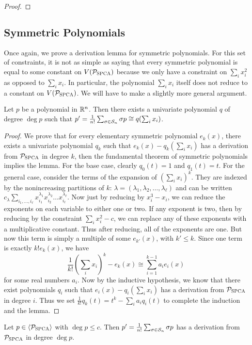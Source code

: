\begin{proof}
\end{proof}

\subsection{Symmetric Polynomials}
Once again, we prove a derivation lemma for symmetric polynomials. For this set of constraints, it is not as simple as saying that every symmetric polynomial is equal to some constant on $V(\mathcal P_{\textsc{SPCA}})$ because we only have a constraint on $\sum_i x_i^2$ as opposed to $\sum_i x_i$. In particular, the polynomial $\sum_i x_i$ itself does not reduce to a constant on $V(\mathcal P_{\textsc{SPCA}})$. We will have to make a slightly more general argument.
\begin{lemma}\label{lem:bpca-symmetric}
Let $p$ be a polynomial in $\mathbb R^n$. Then there exists a univariate polynomial $q$ of degree $\deg p$ such that $p' = \frac{1}{n!}\sum_{\sigma \in \mathcal S_n} \sigma p \cong q(\sum_i x_i)$.
\end{lemma}
\begin{proof}
We prove that for every elementary symmetric polynomial $e_k(x)$, there exists a univariate polynomial $q_k$ such that $e_k(x) - q_k(\sum_i x_i)$ has a derivation from $\mathcal P_{\textsc{SPCA}}$ in degree $k$, then the fundamental theorem of symmetric polynomials implies the lemma. For the base case, clearly $q_0(t) = 1$ and $q_1(t) = t$. For the general case, consider the terms of the expansion of $\left(\sum_i x_i\right)^k$. They are indexed by the nonincreasing partitions of $k$: $\lambda = (\lambda_1, \lambda_2, \dots, \lambda_\ell)$ and can be written $c_\lambda \sum_{i_1,\dots,i_\ell} x_{i_1}^{\lambda_1} x_{i_2}^{\lambda_2} \dots x_{i_\ell}^{\lambda_\ell}$. Now just by reducing by $x_i^3 - x_i$, we can reduce the exponents on each variable to either one or two. If any exponent is two, then by reducing by the constraint $\sum_i x_i^2 - c$, we can replace any of these exponents with a multiplicative constant. Thus after reducing, all of the exponents are one. But now this term is simply a multiple of some $e_{k'}(x)$, with $k' \leq k$. Since one term is exactly $k!e_k(x)$, we have
\[\frac{1}{k!}\left(\sum_i x_i\right)^k - e_k(x) \cong \sum_{i=1}^{k-1} a_i e_i(x)\]
for some real numbers $a_i$. Now by the inductive hypothesis, we know that there exist polynomials $q_i$ such that $e_i(x) - q_i(\sum_i x_i)$ has a derivation from $\mathcal P_{\textsc{SPCA}}$ in degree $i$. Thus we set $\frac{1}{k!}q_k(t) = t^k - \sum_i a_i q_i(t)$ to complete the induction and the lemma.
\end{proof}
\begin{corollary}
Let $p \in \langle \mathcal P_{\textsc{SPCA}} \rangle$ with $\deg p \leq c$. Then $p' = \frac{1}{n!}\sum_{\sigma \in \mathcal S_n} \sigma p$ has a derivation from $\mathcal P_{\textsc{SPCA}}$ in degree $\deg p$. 
\end{corollary}
